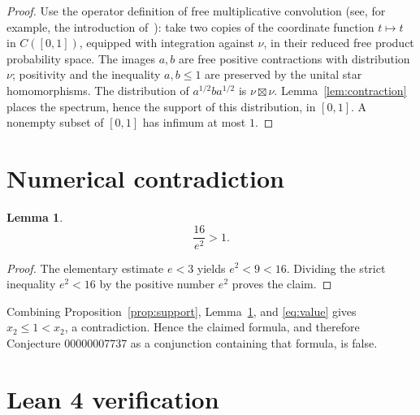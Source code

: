 \documentclass[11pt]{article}
\newtheorem{lemma}[proposition]{Lemma}
\begin{document}
\begin{proof}
Use the operator definition of free multiplicative convolution
(see, for example, the introduction of~\cite{Ji}): take two copies of
the coordinate function $t\mapsto t$ in $C([0,1])$, equipped with integration
against $\nu$, in their reduced free product probability space. The images
$a,b$ are free positive contractions with distribution $\nu$; positivity and
the inequality $a,b\le1$ are preserved by the unital star homomorphisms.
The distribution of
$a^{1/2}ba^{1/2}$ is $\nu\boxtimes\nu$. Lemma~\ref{lem:contraction} places
the spectrum, hence the support of this distribution, in $[0,1]$. A nonempty
subset of $[0,1]$ has infimum at most $1$.
\end{proof}

\section{Numerical contradiction}

\begin{lemma}\label{lem:numerical}
\[
  \frac{16}{e^2}>1.
\]
\end{lemma}

\begin{proof}
The elementary estimate $e<3$ yields $e^2<9<16$. Dividing the strict
inequality $e^2<16$ by the positive number $e^2$ proves the claim.
\end{proof}

Combining Proposition~\ref{prop:support}, Lemma~\ref{lem:numerical}, and
\eqref{eq:value} gives $x_2\le1<x_2$, a contradiction. Hence the claimed
formula, and therefore Conjecture 00000007737 as a conjunction containing
that formula, is false.

\section{Lean 4 verification}
\end{document}
